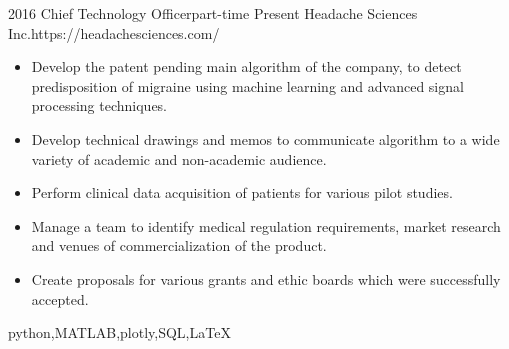 \begin{experiences}
	\myExperience
	{2016}       {Chief Technology Officer}{part-time}
	{Present}      {Headache Sciences Inc.}{https://headachesciences.com/}
	{
		\begin{itemize}
			\item Develop the patent pending main algorithm of the company, to detect predisposition of migraine using machine learning and advanced signal processing techniques. 
			\item Develop technical drawings and memos to communicate algorithm to a wide variety of academic and non-academic audience. 
			\item Perform clinical data acquisition of patients for various pilot studies. 
			\item Manage a team to identify medical regulation requirements, market research and venues of commercialization of the product. 
			\item Create proposals for various grants and ethic boards which were successfully accepted.
		\end{itemize}
	}
	{python,MATLAB,plotly,SQL,\LaTeX}
	
\end{experiences}
